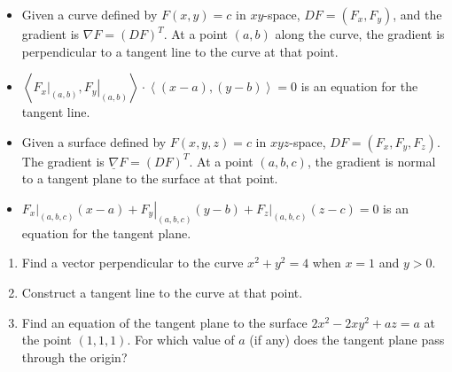 \documentclass[12pt,letterpaper,noanswers]{exam}
\newcommand{\mb}[1]{\underline{#1}}
\begin{document}
\begin{tcolorbox}
\begin{itemize}
\itemsep0em
\item Given a curve defined by $F(x,y) = c$ in $xy$-space, $DF = (F_x, F_y)$, and the gradient is $\nabla F = (DF)^T$.  At a point $(a,b)$ along the curve, the gradient is perpendicular to a tangent line to the curve at that point.  

\item $\left\langle\left.F_x\right\vert_{(a,b)}, \left.F_y\right\vert_{(a,b)}\right\rangle\cdot\left\langle (x-a),(y-b)\right\rangle =0$ is an equation for the tangent line.

\item Given a surface defined by $F(x,y,z) = c$ in $xyz$-space, $DF = (F_x, F_y, F_z)$.  The gradient is $\mb{\nabla}F = (DF)^T$.  At a point $(a,b,c)$, the gradient is normal to a tangent plane to the surface at that point. 

\item $\left.F_x\right\vert_{(a,b,c)}(x-a)+\left.F_y\right\vert_{(a,b,c)}(y-b)+\left.F_z\right\vert_{(a,b,c)}(z-c)=0$ is an equation for the tangent plane.
\end{itemize}
\end{tcolorbox}

\begin{enumerate}
    \item Find a vector perpendicular to the curve $x^2+y^2 = 4$ when $x = 1$ and $y>0$.
    \vspace{1in}
    
    \item Construct a tangent line to the curve at that point.
    \vspace{1in}
    
    \item Find an equation of the tangent plane to the surface $2x^2-2xy^2+az = a$ at the point $(1,1,1)$.  For which value of $a$ (if any) does the tangent plane pass through the origin?
    \vspace{1.5in}
\end{enumerate}




\end{document}
